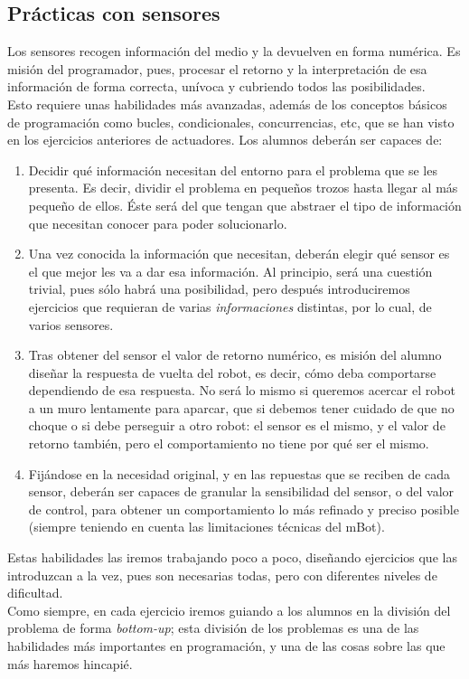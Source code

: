 \subsection{Prácticas con sensores} \label{subsec:practicassensores}
Los sensores recogen información del medio y la devuelven en forma numérica. Es misión del programador, pues, procesar el retorno y la interpretación de esa información de forma correcta, unívoca y cubriendo todos las posibilidades. \\
Esto requiere unas habilidades más avanzadas, además de los conceptos básicos de programación como bucles, condicionales, concurrencias, etc, que se han visto en los ejercicios anteriores de actuadores. Los alumnos deberán ser capaces de:
\begin{enumerate}
	\item Decidir qué información necesitan del entorno para el problema que se les presenta. Es decir, dividir el problema en pequeños trozos hasta llegar al más pequeño de ellos. Éste será del que tengan que abstraer el tipo de información que necesitan conocer para poder solucionarlo.
	\item Una vez conocida la información que necesitan, deberán elegir qué sensor es el que mejor les va a dar esa información. Al principio, será una cuestión trivial, pues sólo habrá una posibilidad, pero después introduciremos ejercicios que requieran de varias \textit{informaciones} distintas, por lo cual, de varios sensores.
	\item Tras obtener del sensor el valor de retorno numérico, es misión del alumno diseñar la respuesta de vuelta del robot, es decir, cómo deba comportarse dependiendo de esa respuesta. No será lo mismo si queremos acercar el robot a un muro lentamente para aparcar, que si debemos tener cuidado de que no choque o si debe perseguir a otro robot: el sensor es el mismo, y el valor de retorno también, pero el comportamiento no tiene por qué ser el mismo. 	
	\item Fijándose en la necesidad original, y en las repuestas que se reciben de cada sensor, deberán ser capaces de granular la sensibilidad del sensor, o del valor de control, para obtener un comportamiento lo más refinado y preciso posible (siempre teniendo en cuenta las limitaciones técnicas del mBot).
\end{enumerate}

Estas habilidades las iremos trabajando poco a poco, diseñando ejercicios que las introduzcan a la vez, pues son necesarias todas, pero con diferentes niveles de dificultad.\\
Como siempre, en cada ejercicio iremos guiando a los alumnos en la división del problema de forma \textit{bottom-up}; esta división de los problemas es una de las habilidades más importantes en programación, y una de las cosas sobre las que más haremos hincapié.

